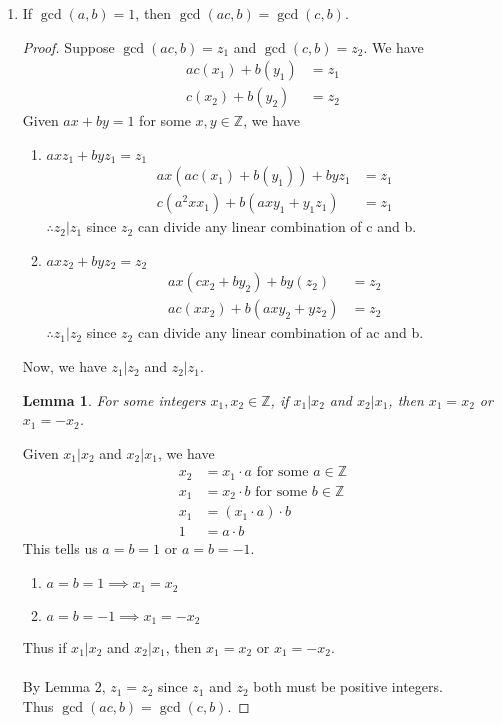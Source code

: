 \documentclass[letterpaper]{article}
\newtheorem{lemma}{Lemma}
\begin{document}
\begin{enumerate}
\begin{enumerate}
		\item If $\gcd(a, b) = 1$, then $\gcd(ac, b) = \gcd(c, b)$.
			\begin{proof}
				Suppose $\gcd(ac,b)=z_1$ and $\gcd(c,b)=z_2$. We have
				\begin{align*}
					ac(x_1)+b(y_1) &= z_1 \\
					c(x_2)+b(y_2) &= z_2
				\end{align*}
				Given $ax+by=1$ for some $x,y\in\mathbb{Z}$, we have 
				\begin{enumerate}
					\item $axz_1+byz_1=z_1$
						\begin{align*}
							ax(ac(x_1)+b(y_1))+byz_1 &= z_1 \\
							c(a^2xx_1)+b(axy_1+y_1z_1) &= z_1
						\end{align*}
						$\therefore z_2 | z_1$ since $z_2$ can divide any linear combination of c and b.
					\item $axz_2+byz_2=z_2$
						\begin{align*}
							ax(cx_2+by_2)+by(z_2) &= z_2 \\
							ac(xx_2)+b(axy_2+yz_2) &= z_2
						\end{align*}
						$\therefore z_1 | z_2$ since $z_2$ can divide any linear combination of ac and b.
				\end{enumerate}
				Now, we have $z_1|z_2$ and $z_2|z_1$. 
				\begin{lemma}
					For some integers $x_1,x_2\in\mathbb{Z}$, if $x_1|x_2$ and $x_2|x_1$, 
					then $x_1=x_2$ or $x_1=-x_2$.
				\end{lemma}
						Given $x_1|x_2$ and $x_2|x_1$, we have 
						\begin{align*}
							x_2 &= x_1\cdot a \text{ for some } a\in\mathbb{Z} \\
							x_1 &= x_2\cdot b \text{ for some } b\in\mathbb{Z} \\
							x_1 &= (x_1\cdot a)\cdot b \\
							1 &= a\cdot b
						\end{align*} 
						This tells us $a=b=1$ or $a=b=-1$.
						\begin{enumerate}
							\item $a=b=1 \implies x_1=x_2$
							\item $a=b=-1 \implies x_1=-x_2$
						\end{enumerate}
						Thus if $x_1|x_2$ and $x_2|x_1$, then $x_1=x_2$ or $x_1=-x_2$. \\\\
				By Lemma 2, $z_1=z_2$ since $z_1$ and $z_2$ both must be positive integers. \\
				Thus $\gcd(ac, b) = \gcd(c, b)$.
			\end{proof}


\end{enumerate}
\end{enumerate}
\end{document}
